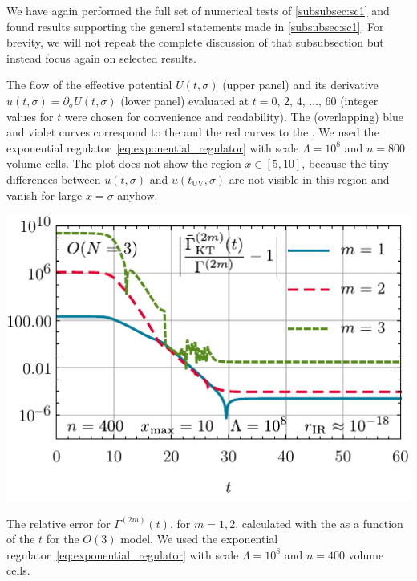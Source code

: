 We have again performed the full set of numerical tests of \cref{subsubsec:sc1} and found results supporting the general statements made in \cref{subsubsec:sc1}.
For brevity, we will not repeat the complete discussion of that subsubsection but instead focus again on selected results.\bigskip

	{%
		\caption{
			The \frg{} flow of the effective potential $U ( t, \sigma )$ (upper panel) and its derivative $u ( t , \sigma ) = \partial_\sigma U ( t , \sigma )$ (lower panel) evaluated at $t = 0, \, 2, \, 4, \, \ldots, \, 60$ (integer values for $t$ were chosen for convenience and readability). 
			The (overlapping) {blue} and {violet} curves correspond to the \uv{} and the {red} curves to the \ir{}.
			We used the exponential regulator~\eqref{eq:exponential_regulator} with \uv{} scale $\Lambda = 10^{8}$ and $n = 800$ volume cells.
			The plot does not show the region ${x \in[5,10]}$, because the tiny differences between $u ( t, \sigma )$ and $u ( t_\mathrm{UV}, \sigma )$ are not visible in this region and vanish for large $x = \sigma$ anyhow.
		}%
		\label{fig:sc_iv_on_3_n_800_xmax_10_lambda_1e8_tir_60_rg_flow}%
	}%
	{%
		\includegraphics[width=\subcaptionFigureWidth]{0d/figures/sc_iv_on_3_n_400_xmax_10_lambda_1e8_tir_60_flow_errors.pdf}
		\caption{
			The relative error for $\Gamma^{(2m)}(t)$, for $m = 1, 2$, calculated with the \ktScheme{} as a function of the \rgtime{} $t$ for the $O(3)$ model.
			We used the exponential regulator~\eqref{eq:exponential_regulator} with \uv{} scale $\Lambda = 10^{8}$ and $n = 400$ volume cells.
		}%
		\label{fig:sc_iv_on_3_n_400_xmax_10_lambda_1e8_tir_60_flow_errors}%
	}%
